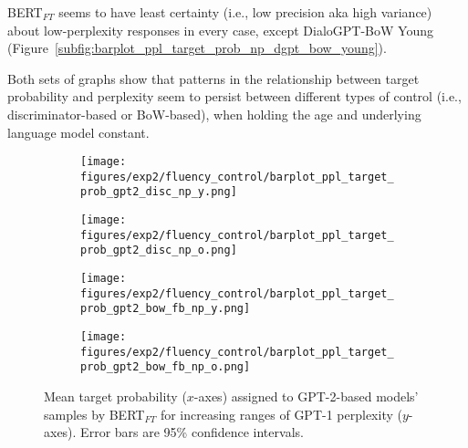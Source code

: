 BERT$_{FT}$ seems to have least certainty (i.e., low precision aka high variance) about low-perplexity responses in every case, except DialoGPT-BoW Young (Figure~\ref{subfig:barplot_ppl_target_prob_np_dgpt_bow_young}).

Both sets of graphs show that patterns in the relationship between target probability and perplexity seem to persist between different types of control (i.e., discriminator-based or BoW-based), when holding the age and underlying language model constant.

\begin{figure}[H]
     \centering
     \begin{subfigure}[b]{0.48\textwidth}
        \centering
        \texttt{[image: figures/exp2/fluency\_control/barplot\_ppl\_target\_prob\_gpt2\_disc\_np\_y.png]}
        \caption{}
        \label{subfig:barplot_ppl_target_prob_np_gpt2_disc_young}
     \end{subfigure}
     \quad
     \begin{subfigure}[b]{0.48\textwidth}
        \centering
        \texttt{[image: figures/exp2/fluency\_control/barplot\_ppl\_target\_prob\_gpt2\_disc\_np\_o.png]}
        \caption{}
        \label{subfig:barplot_ppl_target_prob_np_gpt2_disc_old}
     \end{subfigure}
    \medskip
    \begin{subfigure}[b]{0.48\textwidth}
        \centering
        \texttt{[image: figures/exp2/fluency\_control/barplot\_ppl\_target\_prob\_gpt2\_bow\_fb\_np\_y.png]}
        \caption{}
        \label{subfig:barplot_ppl_target_prob_np_gpt2_bow_young}
     \end{subfigure}
    \quad
     \begin{subfigure}[b]{0.48\textwidth}
        \centering
        \texttt{[image: figures/exp2/fluency\_control/barplot\_ppl\_target\_prob\_gpt2\_bow\_fb\_np\_o.png]}
        \caption{}
        \label{subfig:barplot_ppl_target_prob_np_gpt2_bow_old}
     \end{subfigure}
    \caption{Mean target probability ($x$-axes) assigned to GPT-2-based models' samples by BERT$_{FT}$ for increasing ranges of GPT-1 perplexity ($y$-axes). Error bars are 95\% confidence intervals.}
    \label{fig:barplot_ppl_target_prob_np_gpt2}
\end{figure}

